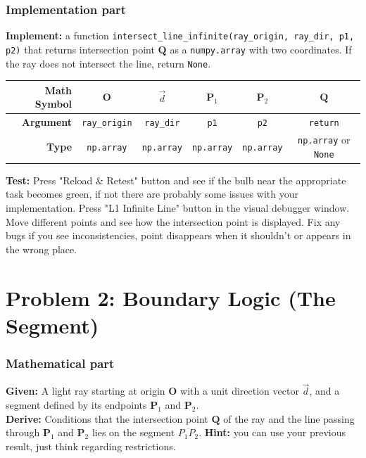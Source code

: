 \documentclass[11pt]{article}
\begin{document}
\subsubsection*{Implementation part}
\textbf{Implement:} a function \lstinline|intersect_line_infinite(ray_origin, ray_dir, p1, p2)| that returns intersection point $\mathbf{Q}$ as a \lstinline|numpy.array| with two coordinates. If the ray does not intersect the line, return \lstinline|None|.
\begin{center}
\renewcommand{\arraystretch}{2.0}
\begin{tabular}{r | c | c | c | c | c}
\toprule
\textbf{Math Symbol} & $\mathbf{O}$ & $\vec{d}$ & $\mathbf{P}_1$ & $\mathbf{P}_2$ & $\mathbf{Q}$ \\ \midrule
\textbf{Argument} & \lstinline|ray_origin| & \lstinline|ray_dir| & \lstinline|p1| & \lstinline|p2| & \lstinline|return| \\ \midrule
\textbf{Type} & \lstinline|np.array| & \lstinline|np.array| & \lstinline|np.array| & \lstinline|np.array| & \lstinline|np.array| or \lstinline|None| \\
\bottomrule
\end{tabular}
\end{center}
\textbf{Test:} Press "Reload \& Retest" button and see if the bulb near the appropriate task becomes green, if not there are probably some issues with your implementation. Press "L1 Infinite Line" button in the visual debugger window. Move different points and see how the intersection point is displayed. Fix any bugs if you see inconsistencies, point disappears when it shouldn't or appears in the wrong place.

\section*{Problem 2: Boundary Logic (The Segment)}

\subsubsection*{Mathematical part}
\textbf{Given:} A light ray starting at origin $\mathbf{O}$ with a unit direction vector $\vec{d}$, and a segment defined by its endpoints $\mathbf{P}_1$ and $\mathbf{P}_2$. \\
\textbf{Derive:} Conditions that the intersection point $\mathbf{Q}$ of the ray and the line passing through $\mathbf{P}_1$ and $\mathbf{P}_2$ lies on the segment $\overline{P_1P_2}$. \textbf{Hint:} you can use your previous result, just think regarding restrictions.\\
\end{document}
